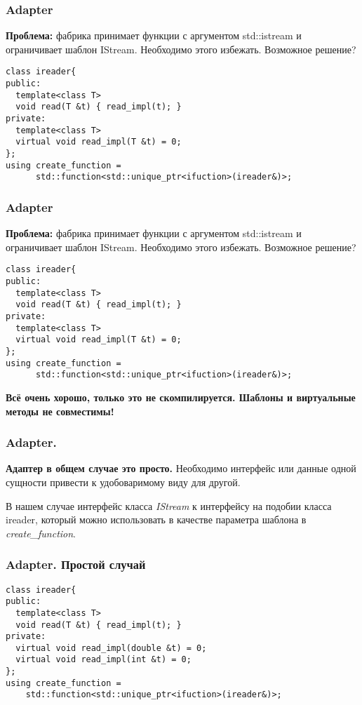 \begin{frame}[fragile]
  \frametitle{Adapter}
  \textbf{Проблема:} фабрика принимает функции с аргументом std::istream и ограничивает шаблон IStream.
  Необходимо этого избежать. Возможное решение?
  
  \begin{verbatim}
class ireader{
public:
  template<class T>
  void read(T &t) { read_impl(t); }
private:
  template<class T>
  virtual void read_impl(T &t) = 0;
};
using create_function = 
      std::function<std::unique_ptr<ifuction>(ireader&)>;
  \end{verbatim}
\end{frame}

\begin{frame}[fragile]
  \frametitle{Adapter}
  \textbf{Проблема:} фабрика принимает функции с аргументом std::istream и ограничивает шаблон IStream.
  Необходимо этого избежать. Возможное решение?
  
  \begin{verbatim}
class ireader{
public:
  template<class T>
  void read(T &t) { read_impl(t); }
private:
  template<class T>
  virtual void read_impl(T &t) = 0;
};
using create_function = 
      std::function<std::unique_ptr<ifuction>(ireader&)>;
  \end{verbatim}
  \bf{Всё очень хорошо, только это не скомпилируется. Шаблоны и виртуальные методы не совместимы!}
\end{frame}

\begin{frame}[fragile]
  \frametitle{Adapter. }
  \textbf{Адаптер в общем случае это просто.} Необходимо интерфейс или данные одной сущности привести к удобоваримому виду для другой.
  \vspace{10pt}
  
  В нашем случае интерфейс класса \textit{IStream} к интерфейсу на подобии класса ireader, который можно использовать в качестве параметра шаблона в \textit{create\_function}.
\end{frame}

\begin{frame}[fragile]
  \frametitle{Adapter. Простой случай}
    \begin{verbatim}
class ireader{
public:
  template<class T>
  void read(T &t) { read_impl(t); }
private:
  virtual void read_impl(double &t) = 0;
  virtual void read_impl(int &t) = 0;
};
using create_function = 
    std::function<std::unique_ptr<ifuction>(ireader&)>;
  \end{verbatim}
\end{frame}

